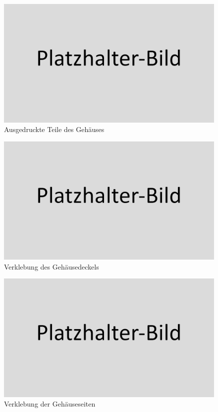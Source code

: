 \begin{figure}[h!tb]
	\includegraphics[width=1\textwidth]{img/placeholder.png}
	\caption[Ausgedruckte Teile des Gehäuses]{Ausgedruckte Teile des Gehäuses}
	\label{fig:printet_parts}
\end{figure}
\begin{figure}[h!tb]
	\includegraphics[width=1\textwidth]{img/placeholder.png}
	\caption[Verklebung des Gehäusedeckels]{Verklebung des Gehäusedeckels}
	\label{fig:glued_parts_01}
\end{figure}
\begin{figure}[h!tb]
	\includegraphics[width=1\textwidth]{img/placeholder.png}
	\caption[Verklebung der Gehäuseseiten]{Verklebung der Gehäuseseiten}
	\label{fig:glued_parts_02}
\end{figure}
